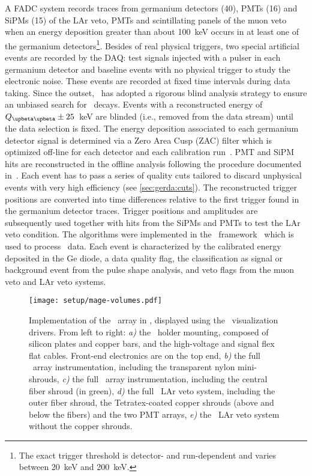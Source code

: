 A FADC system records traces from germanium detectors (40), PMTs (16) and SiPMs (15) of
the LAr veto, PMTs and scintillating panels of the muon veto when an energy deposition
greater than about 100~keV occurs in at least one of the germanium detectors\footnote{The
  exact trigger threshold is detector- and run-dependent and varies between 20~keV and
200~keV.}. Besides of real physical triggers, two special artificial events are recorded
by the DAQ: test signals injected with a pulser in each germanium detector and baseline
events with no physical trigger to study the electronic noise. These events are recorded
at fixed time intervals during data taking. Since the outset, \gerda\ has adopted a
rigorous blind analysis strategy to ensure an unbiased search for \onbb\ decays. Events with
a reconstructed energy of $\qbbM \pm 25$~keV are blinded (i.e., removed from
the data stream) until the data selection is fixed.
\newpar
The energy deposition associated to each germanium detector signal is
determined via a Zero Area Cusp (ZAC) filter which is optimized off-line for each detector
and each calibration run~\cite{Agostini2015}. PMT and SiPM hits are reconstructed in the
offline analysis following the procedure documented in~\cite{Agostini2018a}. Each event
has to pass a series of quality cuts tailored to discard unphysical events with very high
efficiency (see \cref{sec:gerda:cuts}). The reconstructed trigger positions are converted
into time differences relative to the first trigger found in the germanium detector
traces. Trigger positions and amplitudes are subsequently used together with hits from the
SiPMs and PMTs to test the LAr veto condition. The algorithms were implemented in the \gelatio\
framework~\cite{Agostini2011} which is used to process \gerda\ data. Each event is
characterized by the calibrated energy deposited in the Ge diode, a data quality flag, the
classification as signal or background event from the pulse shape analysis, and veto flags
from the muon veto and LAr veto systems.

\begin{figure}
  \centering
  \texttt{[image: setup/mage-volumes.pdf]}
  \caption{%
    Implementation of the \gerda\ array in \mage, displayed using the \geant\
    visualization drivers. From left to right: \emph{a)} the \phasetwo\ holder mounting,
    composed of silicon plates and copper bars, and the high-voltage and signal flex flat
    cables.  Front-end electronics are on the top end, \emph{b)} the full \phasetwo\ array
    instrumentation, including the transparent nylon mini-shrouds, \emph{c)} the full
    \phasetwop\ array instrumentation, including the central fiber shroud (in green),
    \emph{d)} the full \phasetwo\ LAr veto system, including the outer fiber shroud, the
    Tetratex\reg-coated copper shrouds (above and below the fibers) and the two PMT
    arrays, \emph{e)} the \phasetwop\ LAr veto system without the copper shrouds.
  }\label{fig:setup:magevolumes}
\end{figure}

